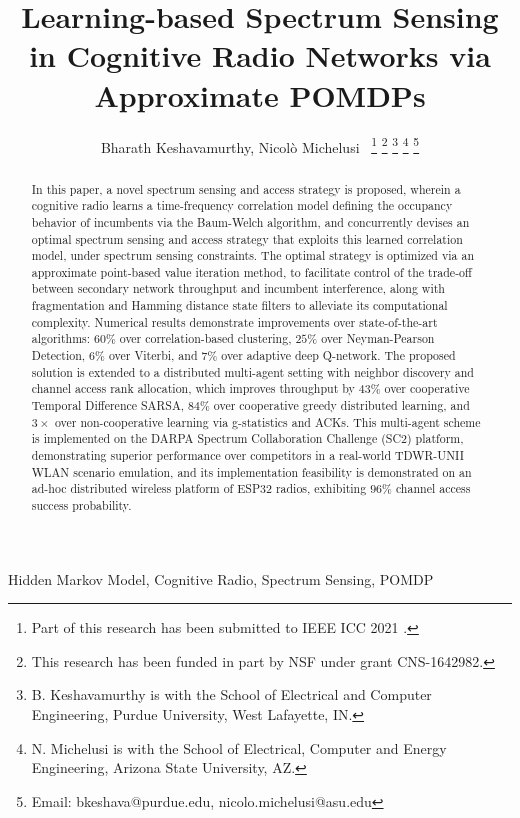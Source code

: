 \documentclass[10pt, twocolumn]{IEEEtran}
\title{Learning-based Spectrum Sensing in Cognitive Radio Networks via Approximate POMDPs}
\author{Bharath Keshavamurthy, Nicol\`{o} Michelusi~\IEEEmembership{Senior Member,~IEEE}
\thanks{Part of this research has been submitted to IEEE ICC 2021 \cite{ICC:paper}.}
\thanks{This research has been funded in part by NSF under grant CNS-1642982.}
\thanks{B. Keshavamurthy is with the School of Electrical and Computer Engineering, Purdue University, West Lafayette, IN.}
\thanks{N. Michelusi is with the School of Electrical, Computer and Energy Engineering, Arizona State University, AZ.}
\thanks{Email: bkeshava@purdue.edu, nicolo.michelusi@asu.edu}

\vspace{-12mm}}
\begin{document}
\maketitle
\thispagestyle{plain}
\pagestyle{plain} 

\begin{abstract}
In this paper, a novel spectrum sensing and access strategy is proposed, wherein a cognitive radio learns a time-frequency correlation model defining the occupancy behavior of incumbents via the Baum-Welch algorithm, and concurrently devises an optimal spectrum sensing and access strategy that exploits this learned correlation model, under spectrum sensing constraints. The optimal strategy is optimized via an approximate point-based value iteration method,
to facilitate control of the trade-off between secondary network throughput and incumbent interference,
 along with fragmentation and Hamming distance state filters to alleviate its computational complexity. Numerical results demonstrate improvements
 over state-of-the-art algorithms:
 $60$\%  over correlation-based clustering, $25$\% over Neyman-Pearson Detection, $6$\%  over Viterbi, and $7$\% over adaptive deep Q-network. The proposed solution is extended to a distributed multi-agent setting with neighbor discovery and channel access rank allocation, which improves throughput by $43$\%  over cooperative Temporal Difference SARSA, $84$\% over cooperative greedy distributed learning, and $3\times$ over non-cooperative learning via g-statistics and ACKs. This multi-agent scheme is implemented 
on the DARPA Spectrum Collaboration Challenge (SC2) platform, demonstrating superior performance over competitors in a real-world TDWR-UNII WLAN scenario emulation,
and its implementation feasibility is demonstrated on an ad-hoc distributed wireless platform of ESP32 radios, exhibiting $96$\% channel access success probability.
\end{abstract}

\begin{IEEEkeywords}
Hidden Markov Model, Cognitive Radio, Spectrum Sensing, POMDP
\end{IEEEkeywords}
\vspace{-3mm}
\end{document}
